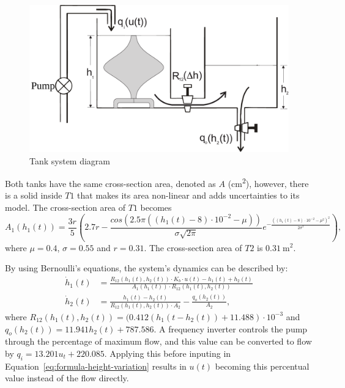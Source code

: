 \begin{figure}[ht!]
	\centering \captionsetup{justification=centering}
	\includegraphics[width=0.9\linewidth]{imgs/tanks}
	\caption{Tank system diagram}%
	\label{fig:tanks}
\end{figure}

Both tanks have the same cross-section area, denoted as \(A\)
(\si{\square\centi\metre}), however, there is a solid inside \(T1\) that makes its
area non-linear and adds uncertainties to its model. The cross-section area of
\(T1\) becomes
%
\begin{equation}
	\label{eq:t1-area}
	A_{1}(h_{1}(t)) = \frac{3r}{5} \left(
	2.7r - \frac{cos(2.5\pi{}((h_{1}(t)-8)\cdot{}10^{-2}-\mu))}{\sigma{}\sqrt{2\pi}}
	e^{-\frac{((h_{1}(t)-8)\cdot{}10^{-2}-\mu^{2})^{2}}{2\sigma^{2}}}
	\right),
\end{equation}
%
where \(\mu=0.4\), \(\sigma=0.55\) and \(r=0.31\). The cross-section area of
\(T2\) is \(\SI{0.31}{\square\metre}\).

By using Bernoulli's equations, the system's dynamics can be described by:
%
\begin{equation}
	\label{eq:formula-height-variation}
	\begin{aligned}
		\dot{h}_1(t) & = \frac{R_{12}(h_{1}(t),h_{2}(t))\cdot{}K_{b}\cdot{}u(t)-h_{1}(t)+h_{2}(t)}
		{A_{1}(h_{1}(t))\cdot{}R_{12}(h_{1}(t),h_{2}(t))}                                                                 \\
		\dot{h}_2(t) & = \frac{h_{1}(t)-h_{2}(t)}{R_{12}(h_{1}(t),h_{2}(t))\cdot{}A_{2}} - \frac{q_{o}(h_{2}(t))}{A_{2}},
	\end{aligned}
\end{equation}
%
where
\(R_{12}(h_{1}(t),h_{2}(t))=(0.412(h_{1}(t-h_{2}(t))+11.488)\cdot{}10^{-3}\) and
\(q_{o}(h_{2}(t))=11.941h_{2}(t)+787.586\). A frequency inverter controls the
pump through the percentage of maximum flow, and this value can be converted to
flow by \(q_{i}=13.201u_{t}+220.085\). Applying this before inputing in
Equation~\eqref{eq:formula-height-variation} results in \(u(t)\) becoming this
percentual value instead of the flow directly.

